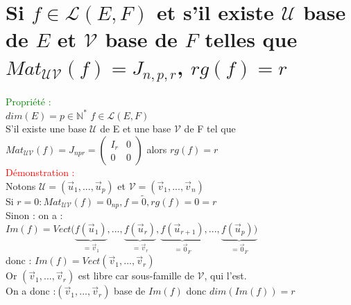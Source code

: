 \documentclass{article}
\begin{document}
        \section{Si $f \in \mathcal L(E,F)$ et s'il existe $\mathcal U$ base de $E$ et $\mathcal V$ base de $F$ telles que $Mat_{\mathcal{UV}}(f)=J_{n,p,r}$, $rg(f)=r$}
				\textcolor{green}{Propriété :} \\
				$dim(E)=p \in \mathbb N^*$ $f \in \mathcal L(E,F)$ \\
				S'il existe une base $\mathcal U$ de E et une base $\mathcal V$ de F tel que $Mat_{\mathcal{UV}}(f)=J_{npr}=\left(\begin{array}{c|c}I _r& 0 \\ \hline0 & 0 \end{array}\right)$ alors $rg(f)=r$ \\
				\textcolor{red}{Démonstration :} \\
				Notons $\mathcal U= (\vec u_1,...,\vec u_p)$ et $\mathcal V=(\vec v_1,...,\vec v_n)$ \\
				Si $r=0:Mat_{\mathcal{UV}}(f)=0_{np},f=\tilde{0},rg(f)=0=r$ \\
				Sinon : on a : \\
				$Im(f)=Vect(\underbrace{f(\vec u_1)}_{=\vec v_1},...,\underbrace{f(\vec u_r)}_{=\vec v_r},\underbrace{f(\vec u_{r+1})}_{=\vec 0_F},...,\underbrace{f(\vec u_p))}_{=\vec 0_F}$ \\
				donc : $Im(f)=Vect(\vec v_1,..., \vec v_r)$ \\
				Or $(\vec v_1,...,\vec v_r)$ est libre car sous-famille de $\mathcal V$, qui l'est. \\
				On a donc :$(\vec v_1,...,\vec v_r)$ base de $Im(f)$ donc $dim(Im(f))=r$
\end{document}
